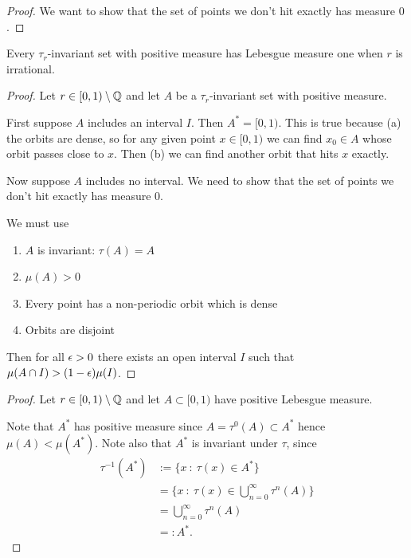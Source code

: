 \begin{enumerate}
\begin{proof}
    We want to show that the set of points we don't hit exactly has measure $0$.


  \end{proof}

  \begin{lemma}
    Every $\tau_r$-invariant set with positive measure has Lebesgue measure one when $r$ is irrational.
  \end{lemma}
  \begin{proof}
    Let $r \in [0, 1) \setminus \mathbb{Q}$ and let $A$ be a $\tau_r$-invariant set with positive measure.

    First suppose $A$ includes an interval $I$. Then $A^* = [0, 1)$. This is true because (a) the orbits are
    dense, so for any given point $x \in [0, 1)$ we can find $x_0 \in A$ whose orbit passes close to $x$. Then
    (b) we can find another orbit that hits $x$ exactly.


    Now suppose $A$ includes no interval. We need to show that the set of points we don't hit exactly has
    measure 0.

    We must use
    \begin{enumerate}
    \item $A$ is invariant: $\tau(A) = A$
    \item $\mu(A) > 0$
    \item Every point has a non-periodic orbit which is dense
    \item Orbits are disjoint
    \end{enumerate}

    Then for all $\epsilon > 0$ there exists an open interval $I$ such that $\mu(A \cap I) > (1 - \epsilon) \mu(I)$.



  \end{proof}

  \begin{proof}
    Let $r \in [0, 1) \setminus \mathbb{Q}$ and let $A \subset [0, 1)$ have positive Lebesgue measure.

    Note that $A^*$ has positive measure since $A = \tau^0(A) \subset A^*$ hence $\mu(A) < \mu(A^*)$. Note also
    that $A^*$ is invariant under $\tau$, since
    \begin{align*}
      \tau^{-1}(A^*)
      &:= \{x ~:~ \tau(x) \in A^* \} \\
      &= \{x ~:~ \tau(x) \in \bigcup_{n=0}^\infty \tau^n(A) \} \\
      &= \bigcup_{n=0}^\infty \tau^n(A) \\
      &=: A^*.
    \end{align*}




  \end{proof}
\end{enumerate}





